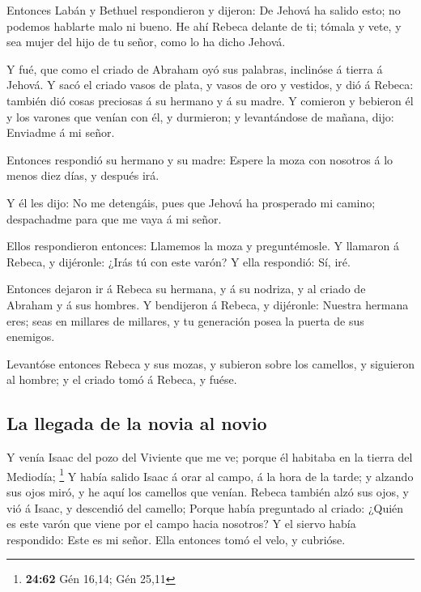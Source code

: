  Entonces Labán y Bethuel respondieron y dijeron: De Jehová
ha salido esto; no podemos hablarte malo ni bueno.  He ahí
Rebeca delante de ti; tómala y vete, y sea mujer del hijo de tu señor,
como lo ha dicho Jehová.

 Y fué, que como el criado de Abraham oyó sus palabras,
inclinóse á tierra á Jehová.  Y sacó el criado vasos de
plata, y vasos de oro y vestidos, y dió á Rebeca: también dió cosas
preciosas á su hermano y á su madre.  Y comieron y bebieron
él y los varones que venían con él, y durmieron; y levantándose de
mañana, dijo: Enviadme á mi señor.

 Entonces respondió su hermano y su madre: Espere la moza
con nosotros á lo menos diez días, y después irá.

 Y él les dijo: No me detengáis, pues que Jehová ha
prosperado mi camino; despachadme para que me vaya á mi señor.

 Ellos respondieron entonces: Llamemos la moza y
preguntémosle.  Y llamaron á Rebeca, y dijéronle: ¿Irás tú
con este varón? Y ella respondió: Sí, iré.

 Entonces dejaron ir á Rebeca su hermana, y á su nodriza, y
al criado de Abraham y á sus hombres.  Y bendijeron á
Rebeca, y dijéronle: Nuestra hermana eres; seas en millares de millares,
y tu generación posea la puerta de sus enemigos.

 Levantóse entonces Rebeca y sus mozas, y subieron sobre
los camellos, y siguieron al hombre; y el criado tomó á Rebeca, y fuése.

\hypertarget{la-llegada-de-la-novia-al-novio}{%
\subsection{La llegada de la novia al
novio}\label{la-llegada-de-la-novia-al-novio}}

 Y venía Isaac del pozo del Viviente que me ve; porque él
habitaba en la tierra del Mediodía; \footnote{\textbf{24:62} Gén 16,14;
  Gén 25,11}  Y había salido Isaac á orar al campo, á la
hora de la tarde; y alzando sus ojos miró, y he aquí los camellos que
venían.  Rebeca también alzó sus ojos, y vió á Isaac, y
descendió del camello;  Porque había preguntado al criado:
¿Quién es este varón que viene por el campo hacia nosotros? Y el siervo
había respondido: Este es mi señor. Ella entonces tomó el velo, y
cubrióse.

